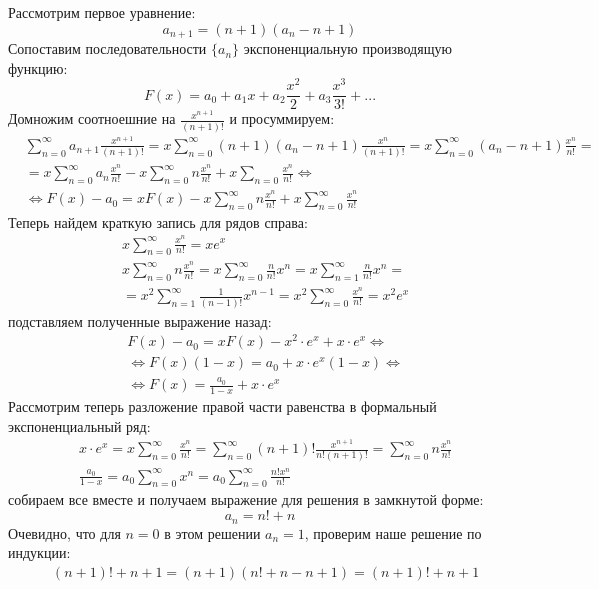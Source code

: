 \documentclass[a4paper,12pt]{article}
\begin{document}
\begin{Solution}
Рассмотрим первое уравнение:
\[
	a_{n+1} = \left(n + 1\right) \left(a_n - n + 1\right)
\]
Сопоставим последовательности $\{a_n\}$ экспоненциальную производящую функцию:
\[
	F\left(x\right) = a_0 + a_1 x + a_2 \frac{x^2}{2} + a_3 \frac{x^3}{3!} + ...
\]
Домножим соотноешние на $\frac{x^{n+1}}{\left(n+1\right)!}$ и просуммируем:
\[
	\begin{split}
		& \sum_{n=0}^{\infty} a_{n+1} \frac{x^{n+1}}{\left(n+1\right)!} = x \sum_{n=0}^{\infty}\left(n+1\right)\left(a_n-n+1\right) \frac{x^n}{\left(n+1\right)!} = x \sum_{n=0}^{\infty} \left(a_n-n+1\right) \frac{x^n}{n!} = \\
		& = x\sum_{n=0}^{\infty} a_n \frac{x^n}{n!} - x \sum_{n=0}^{\infty} n \frac{x^n}{n!} + x \sum_{n=0} \frac{x^n}{n!} \Leftrightarrow \\
		& \Leftrightarrow F\left(x\right) - a_0 = x F\left(x\right) - x \sum_{n=0}^{\infty} n \frac{x^n}{n!} + x \sum_{n=0}^{\infty} \frac{x^n}{n!}
	\end{split}
\]
Теперь найдем краткую запись для рядов справа:
\[
	\begin{split}
		& x \sum_{n=0}^{\infty} \frac{x^n}{n!} = x e^x \\
		& x \sum_{n=0}^{\infty} n \frac{x^n}{n!} = x \sum_{n=0}^{\infty} \frac{n}{n!} x^n = x \sum_{n=1}^{\infty} \frac{n}{n!} x^n = \\
		& = x^2 \sum_{n=1}^{\infty} \frac{1}{\left(n-1\right)!} x^{n-1} = x^2 \sum_{n=0}^{\infty} \frac{x^n}{n!} = x^2 e^x
	\end{split}
\]
подставляем полученные выражение назад:
\[
	\begin{split}
		& F \left(x\right) - a_0 = x F \left(x\right) - x^2 \cdot e^x + x \cdot e^x \Leftrightarrow \\
		& \Leftrightarrow F \left(x\right) \left(1 - x\right) = a_0 + x \cdot e^x \left(1 - x\right) \Leftrightarrow \\
		& \Leftrightarrow F \left(x\right) = \frac{a_0}{1-x} + x \cdot e^x
	\end{split}
\]
Рассмотрим теперь разложение правой части равенства в формальный экспоненциальный ряд:
\[
	\begin{split}
		& x \cdot e^x = x \sum_{n=0}^{\infty} \frac{x^n}{n!} = \sum_{n=0}^{\infty} \left(n+1\right)!\frac{x^{n+1}}{n!\left(n+1\right)!} = \sum_{n=0}^{\infty} n \frac{x^n}{n!} \\
		& \frac{a_0}{1-x} = a_0 \sum_{n=0}^{\infty} x^n = a_0 \sum_{n=0}^{\infty} \frac{n! x^n}{n!}
	\end{split}
\]
собираем все вместе и получаем выражение для решения в замкнутой форме:
\[
	a_n = n! + n
\]
Очевидно, что для $n=0$ в этом решении $a_n = 1$, проверим наше решение по индукции:
\[
	\begin{split}
		& \left(n+1\right)! + n + 1 = \left(n + 1\right)\left(n! + n - n + 1\right) = \left(n+1\right)! + n + 1
	\end{split}
\]


\end{Solution}
\end{document}
